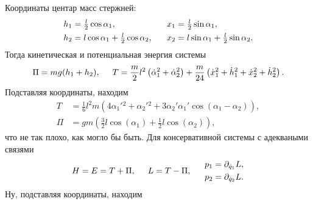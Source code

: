 Координаты центар масс стержней:
\begin{equation*}
    \left.\begin{aligned}
        h_1 &= \textstyle \frac{l}{2} \cos \alpha_1, \\
        h_2 &= \textstyle l \cos \alpha_1 + \frac{l}{2} \cos \alpha_2,\\
    \end{aligned}\right.
    \hspace{5 mm} 
    \left.\begin{aligned}
        x_1 &= \textstyle \frac{l}{2} \sin \alpha_1, \\
        x_2 &= \textstyle l \sin \alpha_1 + \frac{l}{2} \sin \alpha_2.
    \end{aligned}\right.
\end{equation*}
Тогда кинетическая и потенциальная энергия системы
\begin{equation*}
    \Pi = mg(h_1 + h_2),
    \hspace{5 mm} 
    T = \frac{m}{2} l^2 \left(
        \dot{\alpha}_1^2 + \dot{\alpha}_2^2
    \right) + 
    \frac{m}{24} \left(
        \dot{x}_1^2 + \dot{h}_1^2 + \dot{x}_2^2 + \dot{h}_2^2
    \right).
\end{equation*}
Подставляя координаты, находим
\begin{align*}
    T &= \frac{1}{6} l^2 m \left(4 \alpha _1'{}^2+\alpha _2'{}^2+3 \alpha _2' \alpha _1' \cos \left(\alpha _1-\alpha _2\right)\right), \\
    \Pi &= g m \left(\frac{3}{2} l \cos \left(\alpha _1\right)+\frac{1}{2} l \cos \left(\alpha _2\right)\right),
\end{align*}
что не так плохо, как могло бы быть.
Для консервативной системы с адекваными связями
\begin{equation*}
    H = E = T + \Pi, 
    \hspace{5 mm} 
    L = T - \Pi,
    \hspace{5 mm} 
    \left.\begin{aligned}
        p_1 &= \partial_{\dot{q}_1} L, \\
        p_2 &= \partial_{\dot{q}_2} L. \\
    \end{aligned}\right.
\end{equation*}
Ну, подставляя координаты, находим
